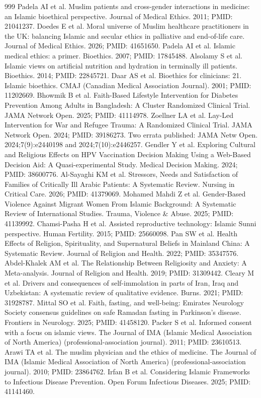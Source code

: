 \documentclass[11pt]{article}
\begin{document}
\begin{thebibliography}{999}
 Padela AI et al. Muslim patients and cross-gender interactions in medicine: an Islamic bioethical perspective. Journal of Medical Ethics. 2011; PMID: 21041237.
 Doedes E et al. Moral universe of Muslim healthcare practitioners in the UK: balancing Islamic and secular ethics in palliative and end-of-life care. Journal of Medical Ethics. 2026; PMID: 41651650.
 Padela AI et al. Islamic medical ethics: a primer. Bioethics. 2007; PMID: 17845488.
 Alsolamy S et al. Islamic views on artificial nutrition and hydration in terminally ill patients. Bioethics. 2014; PMID: 22845721.
 Daar AS et al. Bioethics for clinicians: 21. Islamic bioethics. CMAJ (Canadian Medical Association Journal). 2001; PMID: 11202669.
 Bhowmik B et al. Faith-Based Lifestyle Intervention for Diabetes Prevention Among Adults in Bangladesh: A Cluster Randomized Clinical Trial. JAMA Network Open. 2025; PMID: 41114978.
 Zoellner LA et al. Lay-Led Intervention for War and Refugee Trauma: A Randomized Clinical Trial. JAMA Network Open. 2024; PMID: 39186273. Two errata published: JAMA Netw Open. 2024;7(9):e2440198 and 2024;7(10):e2446257.
 Gendler Y et al. Exploring Cultural and Religious Effects on HPV Vaccination Decision Making Using a Web-Based Decision Aid: A Quasi-experimental Study. Medical Decision Making. 2024; PMID: 38600776.
 Al-Sayaghi KM et al. Stressors, Needs and Satisfaction of Families of Critically Ill Arabic Patients: A Systematic Review. Nursing in Critical Care. 2026; PMID: 41379069.
 Mohamed Mahdi Z et al. Gender-Based Violence Against Migrant Women From Islamic Background: A Systematic Review of International Studies. Trauma, Violence \& Abuse. 2025; PMID: 41139992.
 Chamsi-Pasha H et al. Assisted reproductive technology: Islamic Sunni perspective. Human Fertility. 2015; PMID: 25660098.
 Pan SW et al. Health Effects of Religion, Spirituality, and Supernatural Beliefs in Mainland China: A Systematic Review. Journal of Religion and Health. 2022; PMID: 35347576.
 Abdel-Khalek AM et al. The Relationship Between Religiosity and Anxiety: A Meta-analysis. Journal of Religion and Health. 2019; PMID: 31309442.
 Cleary M et al. Drivers and consequences of self-immolation in parts of Iran, Iraq and Uzbekistan: A systematic review of qualitative evidence. Burns. 2021; PMID: 31928787.
 Mittal SO et al. Faith, fasting, and well-being: Emirates Neurology Society consensus guidelines on safe Ramadan fasting in Parkinson's disease. Frontiers in Neurology. 2025; PMID: 41458120.
 Packer S et al. Informed consent with a focus on islamic views. The Journal of IMA (Islamic Medical Association of North America) (professional-association journal). 2011; PMID: 23610513.
 Arawi TA et al. The muslim physician and the ethics of medicine. The Journal of IMA (Islamic Medical Association of North America) (professional-association journal). 2010; PMID: 23864762.
 Irfan B et al. Considering Islamic Frameworks to Infectious Disease Prevention. Open Forum Infectious Diseases. 2025; PMID: 41141460.
\end{thebibliography}
\end{document}
